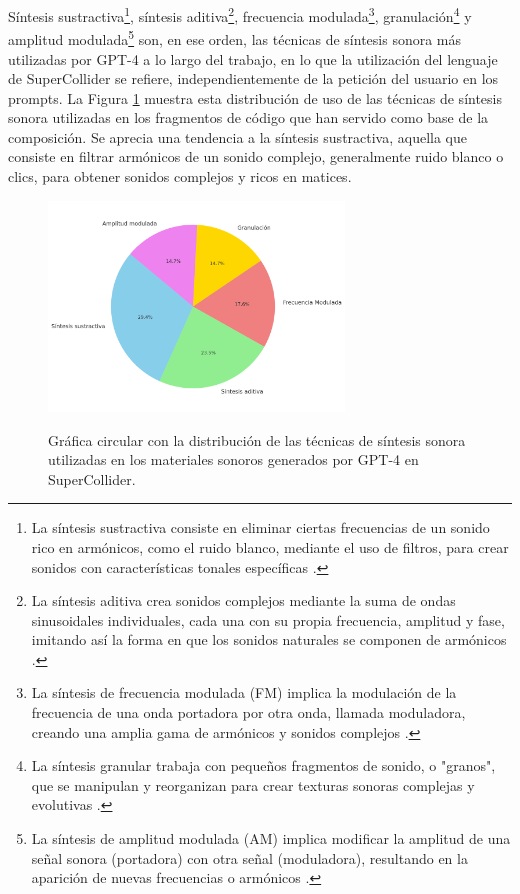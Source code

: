 Síntesis sustractiva\footnote{La síntesis sustractiva consiste en eliminar ciertas frecuencias de un sonido rico en armónicos, como el ruido blanco, mediante el uso de filtros, para crear sonidos con características tonales específicas \citep{AcademiaLabSustractiva}.}, síntesis aditiva\footnote{La síntesis aditiva crea sonidos complejos mediante la suma de ondas sinusoidales individuales, cada una con su propia frecuencia, amplitud y fase, imitando así la forma en que los sonidos naturales se componen de armónicos \citep{AcademiaLabAditiva}.}, frecuencia modulada\footnote{La síntesis de frecuencia modulada (FM) implica la modulación de la frecuencia de una onda portadora por otra onda, llamada moduladora, creando una amplia gama de armónicos y sonidos complejos \citep{AcademiaLabFM}.}, granulación\footnote{La síntesis granular trabaja con pequeños fragmentos de sonido, o "granos", que se manipulan y reorganizan para crear texturas sonoras complejas y evolutivas \citep{AcademiaLabGranular}.} y amplitud modulada\footnote{La síntesis de amplitud modulada (AM) implica modificar la amplitud de una señal sonora (portadora) con otra señal (moduladora), resultando en la aparición de nuevas frecuencias o armónicos \citep{AcademiaLabAM}.} son, en ese orden, las técnicas de síntesis sonora más utilizadas por GPT-4 a lo largo del trabajo, en lo que la utilización del lenguaje de SuperCollider se refiere, independientemente de la petición del usuario en los prompts. La Figura \ref{fig:grafica_sintesis_gpt4} muestra esta distribución de uso de las técnicas de síntesis sonora utilizadas en los fragmentos de código que han servido como base de la composición. Se aprecia una tendencia a la síntesis sustractiva, aquella que consiste en filtrar armónicos de un sonido complejo, generalmente ruido blanco o clics, para obtener sonidos complejos y ricos en matices.

\begin{figure}[H]
    \caption[Gráfica circular con la distribución de las técnicas de síntesis sonora utilizadas en los materiales sonoros generados por GPT-4 en SuperCollider]{Gráfica circular con la distribución de las técnicas de síntesis sonora utilizadas en los materiales sonoros generados por GPT-4 en SuperCollider.}
    \centering
    \includegraphics[width=0.7\textwidth]{./figuras/grafica_sintesis_gpt4_quesitos.png}
    \source{\propio}
    \label{fig:grafica_sintesis_gpt4}
\end{figure}

